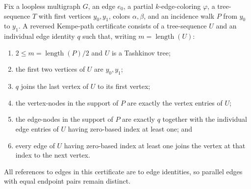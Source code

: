 \begin{definition}
Fix a loopless multigraph $G$, an edge $e_0$, a partial $k$-edge-coloring
$\varphi$, a tree-sequence $T$ with first
vertices $y_0,y_1$, colors $\alpha,\beta$, and an incidence walk $P$ from
$y_0$ to $y_1$.  A reversed Kempe-path certificate consists of a
tree-sequence $U$ and an individual edge identity $q$ such that, writing
$m=\operatorname{length}(U)$:
\begin{enumerate}
\item $2\leq m=\operatorname{length}(P)/2$ and $U$ is a Tashkinov tree;
\item the first two vertices of $U$ are $y_0,y_1$;
\item $q$ joins the last vertex of $U$ to its first vertex;
\item the vertex-nodes in the support of $P$ are exactly the vertex entries
of $U$;
\item the edge-nodes in the support of $P$ are exactly $q$ together with
the individual edge entries of $U$ having zero-based index at least one;
and
\item every edge of $U$ having zero-based index at least one joins the
vertex at that index to the next vertex.
\end{enumerate}
All references to edges in this certificate are to edge identities, so
parallel edges with equal endpoint pairs remain distinct.
\end{definition}
